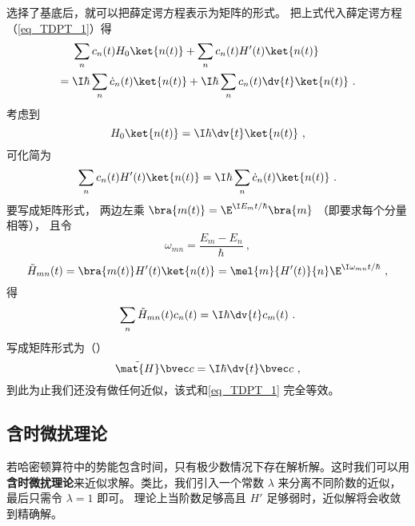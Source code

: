 选择了基底后，就可以把薛定谔方程表示为矩阵的形式。 %
把上式代入薛定谔方程（\autoref{eq_TDPT_1}）得
\begin{equation}
\begin{aligned}
&\sum_n c_n(t) H_0 \ket{n(t)} + \sum_n c_n(t) H'(t) \ket{n(t)} \\ 
={} &\I\hbar \sum_n \dot c_n(t) \ket{n(t)}
+ \I\hbar \sum_n c_n(t) \dv{t} \ket{n(t)}~.
\end{aligned}
\end{equation}
考虑到
\begin{equation}
H_0\ket{n(t)} = \I\hbar \dv{t} \ket{n(t)}~,
\end{equation}
可化简为
\begin{equation}\label{eq_TDPT_11}
\sum_n c_n(t) H'(t) \ket{n(t)}
= \I\hbar \sum_n \dot c_n(t) \ket{n(t)}~.
\end{equation}
要写成矩阵形式， 两边左乘 $\bra{m(t)} = \E^{\I E_m t/\hbar}\bra{m}$ （即要求每个分量相等）， 且令
\begin{equation}
\omega_{mn} = \frac{E_m-E_n}{\hbar}~,
\end{equation}
\begin{equation}\label{eq_TDPT_7}
\tilde H_{mn}(t) = \bra{m(t)} H'(t) \ket{n(t)} = \mel{m}{H'(t)}{n} \E^{\I\omega_{mn}t/\hbar}~,
\end{equation}
得
\begin{equation}\label{eq_TDPT_2}
\sum_n \tilde H_{mn}(t) c_n(t)
= \I\hbar \dv{t} c_m(t)~.
\end{equation}
写成矩阵形式为（）
\begin{equation}\label{eq_TDPT_3}
\tilde{\mat {H}} \bvec c = \I\hbar \dv{t} \bvec c~,
\end{equation}
到此为止我们还没有做任何近似，该式和\autoref{eq_TDPT_1} 完全等效。

\subsection{含时微扰理论}

若哈密顿算符中的势能包含时间，只有极少数情况下存在解析解。这时我们可以用\textbf{含时微扰理论}来近似求解。类比，我们引入一个常数 $\lambda$ 来分离不同阶数的近似，最后只需令 $\lambda = 1$ 即可。 理论上当阶数足够高且 $H'$ 足够弱时，近似解将会收敛到精确解。

